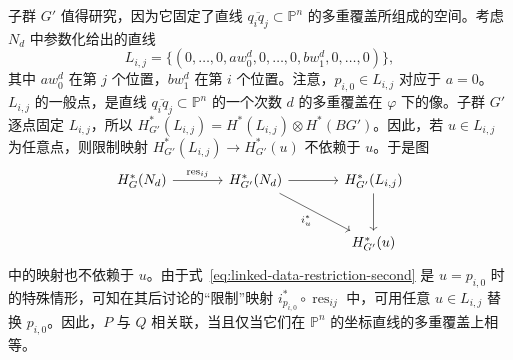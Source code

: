 子群 $G'$ 值得研究，因为它固定了直线 $\overline{q_iq_j}\subset\mathbb P^n$ 的多重覆盖所组成的空间。考虑 $N_d$ 中参数化给出的直线
\[
L_{i,j}=\{(0,\ldots,0,aw_0^d,0,\ldots,0,bw_1^d,0,\ldots,0)\},
\]
其中 $aw_0^d$ 在第 $j$ 个位置，$bw_1^d$ 在第 $i$ 个位置。注意，$p_{i,0}\in L_{i,j}$ 对应于 $a=0$。$L_{i,j}$ 的一般点，是直线 $\overline{q_iq_j}\subset\mathbb P^n$ 的一个次数 $d$ 的多重覆盖在 $\varphi$ 下的像。子群 $G'$ 逐点固定 $L_{i,j}$，所以 $H_{G'}^*(L_{i,j})=H^*(L_{i,j})\otimes H^*(BG')$。因此，若 $u\in L_{i,j}$ 为任意点，则限制映射 $H_{G'}^*(L_{i,j})\to H_{G'}^*(u)$ 不依赖于 $u$。于是图
\[
\begin{tikzcd}[column sep=large,row sep=large]
H_G^*(N_d)\arrow[r,"\operatorname{res}_{ij}"]&H_{G'}^*(N_d)\arrow[r]\arrow[dr,"i_u^*"']&H_{G'}^*(L_{i,j})\arrow[d]\\
&&H_{G'}^*(u)
\end{tikzcd}
\]
中的映射也不依赖于 $u$。由于式~\eqref{eq:linked-data-restriction-second} 是 $u=p_{i,0}$ 时的特殊情形，可知在其后讨论的“限制”映射 $i_{p_{i,0}}^*\circ\operatorname{res}_{ij}$ 中，可用任意 $u\in L_{i,j}$ 替换 $p_{i,0}$。因此，$P$ 与 $Q$ 相关联，当且仅当它们在 $\mathbb P^n$ 的坐标直线的多重覆盖上相等。

